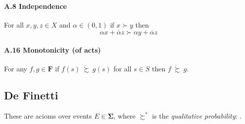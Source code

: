 \documentclass[landscape, 12pt]{extarticle}
\newcommand{\dsuccsim}{\ \dot \succsim \ }
\newcommand{\ddsuccsim}{\ \ddot \succsim \ }
\begin{document}
\begin{multicols}{2}
	\paragraph{A.8 Independence}
	For all $x, y, z \in X$ and $\alpha \in (0,1)$
	if $x \succ y$ then
	\[
		\alpha x + \overline \alpha z \succ \alpha y + \overline \alpha z
	\]

	\paragraph{A.16 Monotonicity (of acts)}
	For any $f, g \in \bm F$ if $f(s) \ddsuccsim g(s)$ for all $s \in S$
	then $f \dsuccsim g$.


	\subsection{De Finetti}
	These are acioms over events $E \in \bm \Sigma$,
	where $\succsim^*$ is the \textit{qualitative probability}:
	.


\end{multicols}
\end{document}
